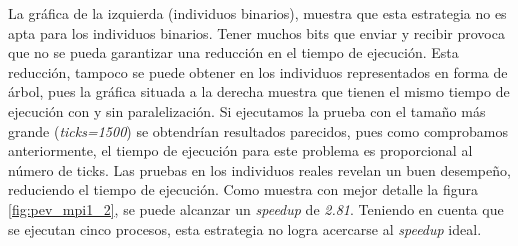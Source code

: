 		La gráfica de la izquierda (individuos binarios), muestra que esta estrategia no es apta para los individuos binarios. Tener muchos bits que enviar y recibir provoca que no se pueda garantizar una reducción en el tiempo de ejecución. Esta reducción, tampoco se puede obtener en los individuos representados en forma de árbol, pues la gráfica situada a la derecha muestra que tienen el mismo tiempo de ejecución con y sin paralelización. Si ejecutamos la prueba con el tamaño más grande (\textit{ticks=1500}) se obtendrían resultados parecidos, pues como comprobamos anteriormente, el tiempo de ejecución para este problema es proporcional al número de ticks. Las pruebas en los individuos reales revelan un buen desempeño, reduciendo el tiempo de ejecución. Como muestra con mejor detalle la figura \ref{fig:pev_mpi1_2}, se puede alcanzar un \textit{speedup} de \textit{2.81}. Teniendo en cuenta que se ejecutan cinco procesos, esta estrategia no logra acercarse al \textit{speedup} ideal.
	
		

